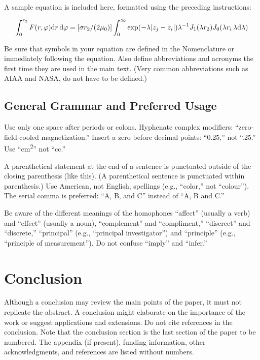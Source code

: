\documentclass[journal ]{new-aiaa}
\begin{document}
A sample equation is included here, formatted using the preceding instructions:

\begin{equation}
\label{sample:equation}
\int^{r_2}_0 F(r,\varphi){\rm d}r\,{\rm d}\varphi = [\sigma r_2/(2\mu_0)]\int^{\infty}_0\exp(-\lambda|z_j-z_i|)\lambda^{-1}J_1 (\lambda r_2)J_0 (\lambda r_i\,\lambda {\rm d}\lambda)
\end{equation}

Be sure that symbols in your equation are defined in the Nomenclature or immediately following the equation. Also define abbreviations and acronyms the first time they are used in the main text. (Very common abbreviations such as AIAA and NASA, do not have to be defined.)

\subsection{General Grammar and Preferred Usage}
Use only one space after periods or colons. Hyphenate complex modifiers: ``zero-field-cooled magnetization.'' Insert a zero before decimal points: ``0.25,'' not ``.25.'' Use ``\si{\centi\meter\squared}'' not ``cc.'' 

A parenthetical statement at the end of a sentence is punctuated outside of the closing parenthesis (like this). (A parenthetical sentence is punctuated within parenthesis.) Use American, not English, spellings (e.g., “color,” not “colour”). The serial comma is preferred: “A, B, and C” instead of “A, B and C.”

Be aware of the different meanings of the homophones “affect” (usually a verb) and “effect” (usually a noun), “complement” and “compliment,” “discreet” and “discrete,” “principal” (e.g., “principal investigator”) and “principle” (e.g., “principle of measurement”). Do not confuse “imply” and “infer.”

\section{Conclusion}
Although a conclusion may review the main points of the paper, it must not replicate the abstract. A conclusion might elaborate on the importance of the work or suggest applications and extensions. Do not cite references in the conclusion. Note that the conclusion section is the last section of the paper to be numbered. The appendix (if present), funding information, other acknowledgments, and references are listed without numbers.
\end{document}
